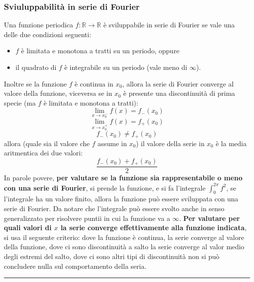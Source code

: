 \subsubsection*{Sviuluppabilità in serie di Fourier}
Una funzione periodica $f: \mathbb{R} \rightarrow  \mathbb{R}$ è sviluppabile in serie di Fourier se vale una delle due condizioni seguenti:
\begin{itemize}
    \item $f$ è limitata e monotona a tratti su un periodo, oppure
    \item il quadrato di $f$ è integrabile su un periodo (vale meno di $\infty$).
\end{itemize}
Inoltre se la funzione $f$ è continua in $x_0$, allora la serie di Fourier converge al valore della funzione, viceversa se in $x_0$ è presente una discontinuità di prima specie (ma $f$ è limitata e monotona a tratti):
\[
    \lim_{x\rightarrow x_0^-} f(x) = f_-(x_0)
\]
\[
    \lim_{x\rightarrow x_0^+} f(x) = f_+(x_0)
\]
\[
    f_-(x_0) \neq f_+(x_0)
\]
allora (quale sia il valore che $f$ assume in $x_0$) il valore della serie in $x_0$ è la media aritmentica dei due valori:
\[
    \frac{f_-(x_0) + f_+(x_0)}{2}
\]
\newline
In parole povere, \textbf{per valutare se la funzione sia rappresentabile o meno con una serie di Fourier}, si prende la funzione, e si fa l'integrale $\int_{0}^{2\pi} f^2$, se l'integrale ha un valore finito, allora la funzione può essere sviluppata con una serie di Fourier. Da notare che l'integrale può essere svolto anche in senso generalizzato per risolvere puntii in cui la funzione va a $\infty$.\newline
\textbf{Per valutare per quali valori di $x$ la serie converge effettivamente alla funzione indicata}, si usa il seguente criterio: dove la funzione è continua, la serie converge al valore della funzione, dove ci sono discontinuità a salto la serie converge al valor medio degli estremi del salto, dove ci sono altri tipi di discontinuità non si può concludere nulla sul comportamento della seria.\newline
\rule{\textwidth}{0,4pt}
